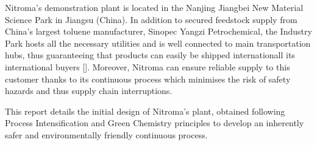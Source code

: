 Nitroma's demonstration plant is located in the Nanjing Jiangbei New Material Science Park in Jiangsu (China). In addition to secured feedstock supply from China’s largest toluene manufacturer, Sinopec Yangzi Petrochemical, the Industry Park hosts all the necessary utilities and is well connected to main transportation hubs, thus guaranteeing that products can easily be shipped internationall its international buyers []. Moreover, Nitroma can ensure reliable supply to this customer thanks to its continuous process which minimises the risk of safety hazards and thus supply chain interruptions.



This report details the initial design of Nitroma's plant, obtained following Process Intensification and Green Chemistry principles to develop an inherently safer and environmentally friendly continuous process.



